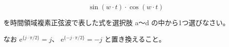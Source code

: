 \[
\sin (w \cdot t) \cdot \cos (w \cdot t)
\]

\bigskip
\noindent を時間領域複素正弦波で表した式を選択肢 a〜d の中から1つ選びなさい。

\noindent なお $\textrm{e}^{\{ j \cdot \pi/2 \}} = j$、 $\textrm{e}^{\{ -j \cdot \pi/2 \}} = -j$ と置き換えること。
